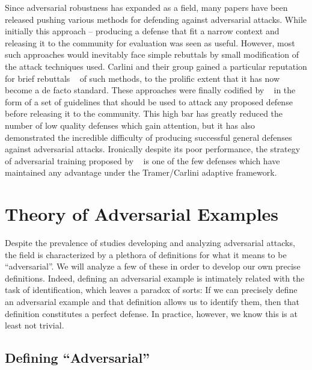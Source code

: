 Since adversarial robustness has expanded as a field, many papers have
been released pushing various methods for defending against
adversarial attacks. While initially this approach -- producing a
defense that fit a narrow context and releasing it to the community
for evaluation was seen as useful. However, most such approaches would
inevitably face simple rebuttals by small modification of the attack
techniques used. Carlini and their group gained a particular
reputation for brief rebuttals ~\citep{carlini_towards_2016, papernot_cleverhans_2016} of such methods, to the prolific extent
that it has now become a de facto standard. These approaches were
finally codified by ~\citet{tramer2020adaptive} in the form of a set of
guidelines that should be used to attack any proposed defense before
releasing it to the community. This high bar has greatly reduced the
number of low quality defenses which gain attention, but it has also
demonstrated the incredible difficulty of producing successful general
defenses against adversarial attacks. Ironically despite its poor
performance, the strategy of adversarial training proposed by
~\citet{tramer2019adversarial} is one of the few
defenses which have maintained any advantage under the Tramer/Carlini
adaptive framework. 


\section{Theory of Adversarial Examples}

Despite the prevalence of studies developing and analyzing adversarial
attacks, the field is characterized by a plethora of definitions for
what it means to be ``adversarial''. We will analyze a few of these in
order to develop our own precise definitions. Indeed, defining an
adversarial example is intimately related with the task of
identification, which leaves a paradox of sorts: If we can precisely
define an adversarial example and that definition allows us to
identify them, then that definition constitutes a perfect defense. In
practice, however, we know this is at least not trivial. 

\subsection{Defining ``Adversarial''}

